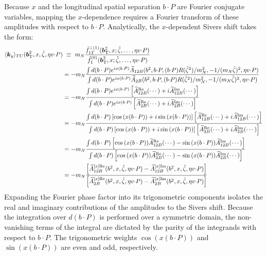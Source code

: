 Because $x$ and the longitudinal spatial separation $b \cdot P$ are Fourier conjugate variables, mapping the $x$-dependence requires a Fourier transform of these amplitudes with respect to $b \cdot P$. Analytically, the $x$-dependent Sivers shift takes the form:
\begingroup\small
\begin{align}
   \langle \boldsymbol{k}_y \rangle_{TU}(\boldsymbol{b}_{\mathrm T}^2,x,{\hat \zeta},\eta v {\cdot} P) 
	&\ \equiv\ m_N \frac{\tilde f_{1T}^{\perp(1)}(\boldsymbol{b}_{\mathrm T}^2,x;{\hat \zeta},\ldots,\eta v {\cdot} P)}{\tilde f_1^{(0)}(\boldsymbol{b}_{\mathrm T}^2,x;{\hat \zeta},\ldots,\eta v {\cdot} P)}  \\
 &=-m_{N} \frac{\int d(b\cdot P)e^{ix(b\cdot P)} \widetilde{A}_{12B}(b^2,b {\cdot} P,(b {\cdot} P) R({\hat \zeta}^2)/m_N^2,-1/(m_N{\hat \zeta})^2,\eta v {\cdot} P)}{\int d(b\cdot P)e^{ix(b\cdot P)}\widetilde{A}_{2B}(b^2,b {\cdot} P,(b {\cdot} P) R({\hat \zeta}^2)/m_N^2,-1/(m_N{\hat \zeta})^2,\eta v {\cdot} P)}  \\
 &=-m_{N} \frac{\int d(b\cdot P)e^{ix(b\cdot P)} \left[\widetilde{A}_{12B}^{\text{Re}}(\cdots)+i\widetilde{A}_{12B}^{\text{Im}}(\cdots)\right]}{\int d(b\cdot P)e^{ix(b\cdot P)}\left[\widetilde{A}_{2B}^{\text{Re}}(\cdots)+i\widetilde{A}_{2B}^{\text{Im}}(\cdots)\right]}\\
 &=-m_{N} \frac{\int d(b\cdot P)\left[\cos{\left(x(b\cdot P)\right)}+i\sin{\left(x(b\cdot P)\right)}\right] \left[\widetilde{A}_{12B}^{\text{Re}}(\cdots)+i\widetilde{A}_{12B}^{\text{Im}}(\cdots)\right]}{\int d(b\cdot P)\left[\cos{\left(x(b\cdot P)\right)}+i\sin{\left(x(b\cdot P)\right)}\right]\left[\widetilde{A}_{2B}^{\text{Re}}(\cdots)+i\widetilde{A}_{2B}^{\text{Im}}(\cdots)\right]}\\
 &=-m_{N} \frac{\int d(b\cdot P) \left[\cos{\left(x(b\cdot P)\right)}\widetilde{A}_{12B}^{\text{Re}}(\cdots)-\sin{\left(x(b\cdot P)\right)}\widetilde{A}_{12B}^{\text{Im}}(\cdots)\right]}{\int d(b\cdot P)\left[\cos{\left(x(b\cdot P)\right)}\widetilde{A}_{2B}^{\text{Re}}(\cdots)-\sin{\left(x(b\cdot P)\right)}\widetilde{A}_{2B}^{\text{Im}}(\cdots)\right]} \\
 &=-m_{N} \frac{\left[\widetilde{A}_{12B}^{[x]\text{Re}}(b^2,x,{\hat \zeta},\eta v {\cdot} P)-\widetilde{A}_{12B}^{[x]\text{Im}}(b^2,x,{\hat \zeta},\eta v {\cdot} P)\right]}{\left[\widetilde{A}_{2B}^{[x]\text{Re}}(b^2,x,{\hat \zeta},\eta v {\cdot} P)-\widetilde{A}_{2B}^{[x]\text{Im}}(b^2,x,{\hat \zeta},\eta v {\cdot} P)\right]}
 \label{eq:sivers_shift_xdep}
 \end{align}
\endgroup
 Expanding the Fourier phase factor into its trigonometric components isolates the real and imaginary contributions of the amplitudes to the Sivers shift. Because the integration over $d(b \cdot P)$ is performed over a symmetric domain, the non-vanishing terms of the integral are dictated by the parity of the integrands with respect to $b \cdot P$. The trigonometric weights $\cos\left(x(b\cdot P)\right)$ and $\sin\left(x(b\cdot P)\right)$ are even and odd, respectively.

